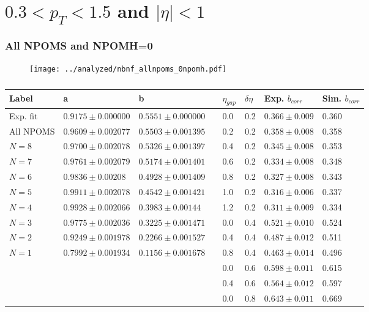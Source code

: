 \documentclass[]{article}
\begin{document}
\listoffigures
\listoftables

\newpage
\section*{\centering $ 0.3 < p_T < 1.5$ and $ |\eta|<1$}
\subsubsection*{\centering All NPOMS and NPOMH=0}

\begin{figure}[h!]
    \centering
\texttt{[image: ../analyzed/nbnf\_allnpoms\_0npomh.pdf]}
    \caption[All NPOMS and NPOMH=0]{}
\end{figure}

\begin{table}[h!]
\centering
    \begin{tabular}{|l|l|l|c|l|l|l|l|}
        \hline
Label     & a      & b     &     & $\eta_{gap}$ & $\delta\eta$ &Exp. $b_{corr}$ &Sim. $b_{corr}$\\\hline
Exp. fit  &$0.9175\pm0.000000$&$0.5551\pm0.000000$&  & 0.0 		    & 0.2 		   &$0.366 \pm0.009$&0.360\\\hline
All NPOMS &$0.9609\pm0.002077$&$0.5503\pm0.001395$&	 & 0.2 			& 0.2 		   &$0.358 \pm0.008$&0.358\\\hline 
$N = 8$	  &$0.9700\pm0.002078$&$0.5326\pm0.001397$&	 & 0.4 			& 0.2 		   &$0.345 \pm0.008$&0.353\\\hline
$N = 7$	  &$0.9761\pm0.002079$&$0.5174\pm0.001401$&	 & 0.6 			& 0.2 		   &$0.334 \pm0.008$&0.348\\\hline
$N = 6$	  &$0.9836\pm0.00208 $&$0.4928\pm0.001409$&	 & 0.8 			& 0.2 		   &$0.327 \pm0.008$&0.343\\\hline
$N = 5$	  &$0.9911\pm0.002078$&$0.4542\pm0.001421$&	 & 1.0 			& 0.2 		   &$0.316 \pm0.006$&0.337\\\hline
$N = 4$	  &$0.9928\pm0.002066$&$0.3983\pm0.00144 $&	 & 1.2 			& 0.2 		   &$0.311 \pm0.009$&0.334\\\hline
$N = 3$	  &$0.9775\pm0.002036$&$0.3225\pm0.001471$&	 & 0.0 			& 0.4 		   &$0.521 \pm0.010$&0.524\\\hline
$N = 2$	  &$0.9249\pm0.001978$&$0.2266\pm0.001527$&	 & 0.4 			& 0.4 		   &$0.487 \pm0.012$&0.511\\\hline
$N = 1$	  &$0.7992\pm0.001934$&$0.1156\pm0.001678$&	 & 0.8 			& 0.4 		   &$0.463 \pm0.014$&0.496\\\hline
          &	                  &               &	     & 0.0			& 0.6		   &$0.598 \pm0.011$&0.615\\\hline
	      &                   &               &      & 0.4 			& 0.6 		   &$0.564 \pm0.012$&0.597\\\hline
		  &	                  &               &	     & 0.0 			& 0.8 		   &$0.643 \pm0.011$&0.669\\\hline
    \end{tabular}
\caption[b correlation table]{}
\end{table}
\end{document}

